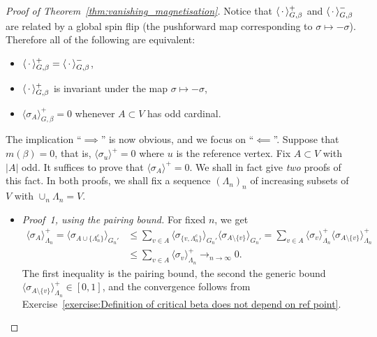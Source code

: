 \begin{proof}[Proof of Theorem~\ref{thm:vanishing_magnetisation}]
    Notice that $\langle\,\cdot\,\rangle_{G,\beta}^+$ and $\langle\,\cdot\,\rangle_{G,\beta}^-$ are related
    by a global spin flip (the pushforward map corresponding to $\sigma\mapsto-\sigma$).
    Therefore all of the following are equivalent:
    \begin{itemize}
        \item $\langle\,\cdot\,\rangle_{G,\beta}^+=\langle\,\cdot\,\rangle_{G,\beta}^-$,
        \item $\langle\,\cdot\,\rangle_{G,\beta}^+$ is invariant under the map $\sigma\mapsto-\sigma$,
        \item $\langle\sigma_A\rangle_{G,\beta}^+=0$ whenever $A\subset V$ has odd cardinal.
    \end{itemize}

    The implication ``$\implies$'' is now obvious, and we focus on  ``$\impliedby$''.
    Suppose that $m(\beta)=0$,
    that is, $\langle\sigma_u\rangle^+=0$ where $u$ is the reference vertex.
    Fix $A\subset V$ with $|A|$ odd.
    It suffices to prove that $\langle\sigma_A\rangle^+=0$.
    We shall in fact give \emph{two} proofs of this fact.
    In both proofs, we shall fix a sequence $(\Lambda_n)_n$ of increasing subsets of $V$ with $\cup_n\Lambda_n=V$.
    \begin{itemize}
        \item \emph{Proof~1, using the pairing bound.}
        For fixed $n$, we get
        \begin{align}
            \langle\sigma_A\rangle_{\Lambda_n}^+
            =\langle\sigma_{A\cup\{\Lambda_n^c\}}\rangle_{G_n'}
            &\leq
            \sum_{v\in A}\langle\sigma_{\{v,\Lambda_n^c\}}\rangle_{G_n'}
            \langle\sigma_{A\setminus\{v\}}\rangle_{G_n'}
            =\sum_{v\in A}\langle\sigma_v\rangle_{\Lambda_n}^+
            \langle\sigma_{A\setminus\{v\}}\rangle_{\Lambda_n}^+
            \\&\leq 
            \sum_{v\in A}\langle\sigma_v\rangle_{\Lambda_n}^+
            \to_{n\to\infty}0.
        \end{align}
        The first inequality is the pairing bound,
        the second the generic bound $\langle\sigma_{A\setminus\{v\}}\rangle_{\Lambda_n}^+\in[0,1]$,
        and the convergence follows from Exercise~\ref{exercise:Definition of critical beta does not depend on ref point}.


\end{itemize}
\end{proof}
